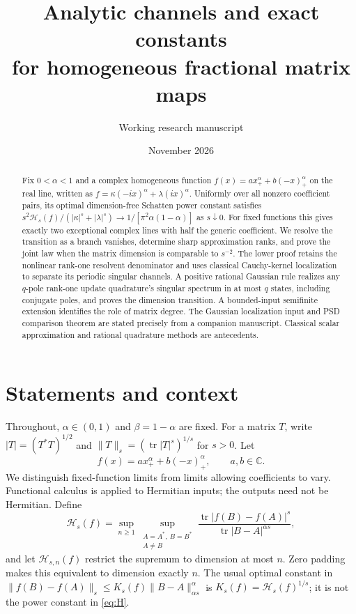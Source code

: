 \documentclass[11pt]{article}
\title{Analytic channels and exact constants\protect\\
for homogeneous fractional matrix maps}
\author{Working research manuscript}
\date{November 2026}
\numberwithin{equation}{section}
\newcommand{\tr}{\operatorname{tr}}
\newcommand{\C}{\mathbb C}
\newcommand{\cH}{\mathcal H}
\begin{document}
\maketitle

\begin{abstract}
Fix $0<\alpha<1$ and a complex homogeneous function
$f(x)=a x_+^\alpha+b(-x)_+^\alpha$ on the real line, written as
$f=\kappa(-ix)^\alpha+\lambda(ix)^\alpha$. Uniformly over all nonzero
coefficient pairs, its optimal dimension-free Schatten power constant
satisfies
$s^2\cH_s(f)/(|\kappa|^s+|\lambda|^s)
\to1/[\pi^2\alpha(1-\alpha)]$ as $s\downarrow0$.
For fixed functions this gives exactly two exceptional complex lines
with half the generic coefficient. We resolve the transition as a
branch vanishes, determine sharp approximation ranks, and prove the
joint law when the matrix dimension is comparable to $s^{-2}$.
The lower proof retains the nonlinear rank-one resolvent denominator
and uses classical Cauchy-kernel localization to separate its periodic
singular channels. A positive rational Gaussian rule realizes any
$q$-pole rank-one update quadrature's singular spectrum in at most $q$ states,
including conjugate poles, and proves the dimension transition.
A bounded-input semifinite extension identifies the role of matrix
degree. The Gaussian localization input and PSD comparison theorem
are stated precisely from a companion manuscript. Classical scalar
approximation and rational quadrature methods are antecedents.
\end{abstract}

\section{Statements and context}

Throughout, $\alpha\in(0,1)$ and $\beta=1-\alpha$ are fixed. For a
matrix $T$, write $|T|=(T^*T)^{1/2}$ and
$\|T\|_s=(\tr|T|^s)^{1/s}$ for $s>0$. Let
\begin{equation}\label{eq:f}
 f(x)=a x_+^\alpha+b(-x)_+^\alpha,\qquad a,b\in\C.
\end{equation}
We distinguish fixed-function limits from limits allowing coefficients
to vary. Functional calculus is
applied to Hermitian inputs; the outputs need not be Hermitian. Define
\begin{equation}\label{eq:H}
 \cH_s(f)=\sup_{n\ge1}\sup_{\substack{A=A^*,\ B=B^*\\A\ne B}}
 \frac{\tr|f(B)-f(A)|^s}{\tr|B-A|^{\alpha s}},
\end{equation}
and let $\cH_{s,n}(f)$ restrict the supremum to dimension at most $n$.
Zero padding makes this equivalent to dimension exactly $n$.
The usual optimal constant in
$\|f(B)-f(A)\|_s\le K_s(f)\|B-A\|_{\alpha s}^\alpha$ is
$K_s(f)=\cH_s(f)^{1/s}$; it is not the power constant in \eqref{eq:H}.
\end{document}
